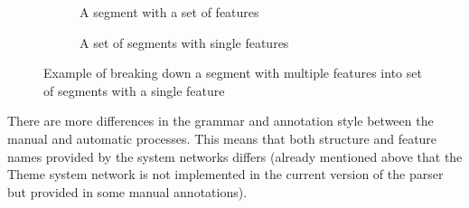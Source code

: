 \begin{figure}[!ht]
    \centering
    \begin{subfigure}[b]{0.47\textwidth}
        \centering
        \caption{A segment with a set of features}
        \label{fig:segment-multiple}
    \end{subfigure}
    \begin{subfigure}[b]{0.47\textwidth}
        \centering
        \caption{A set of segments with single features}
        \label{fig:segment-simple}
    \end{subfigure}
    \caption{Example of breaking down a segment with multiple features into set of segments with a single feature}
    \label{fig:segment-breackdown}
\end{figure}

There are more differences in the grammar and annotation style between the manual and automatic processes. This means that both structure and feature names provided by the system networks differs (already mentioned above that the Theme system network is not implemented in the current version of the parser but provided in some manual annotations). 


